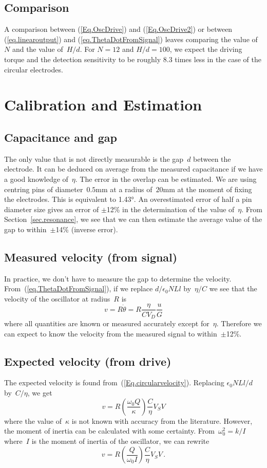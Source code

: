\subsection{Comparison}
A comparison between (\ref{Eq.OscDrive}) and (\ref{Eq.OscDrive2}) or between (\ref{eq.linearoutput}) and (\ref{eq.ThetaDotFromSignal}) leaves comparing the value of~$N$ and the value of~$H/d$. For $N=12$ and $H/d=100$, we expect the driving torque and the detection sensitivity to be roughly 8.3 times less in the case of the circular electrodes.

\section{Calibration and Estimation}
\subsection{Capacitance and gap}
The only value that is not directly measurable is the gap~$d$ between the electrode. It can be deduced on average from the measured capacitance if we have a good knowledge of~$\eta$. The error in the overlap can be estimated. We are using centring pins of diameter~$0.5$mm at a radius of~$20$mm at the moment of fixing the electrodes. This is equivalent to 1.43\si{\degree}. An overestimated error of half a pin diameter size gives an error of $\pm$12\% in the determination of the value of~$\eta$. From Section~\ref{sec.resonance}, we see that we can then estimate the average value of the gap to within~$\pm$14\% (inverse error).
\subsection{Measured velocity (from signal)}
In practice, we don't have to measure the gap to determine the velocity. From~(\ref{eq.ThetaDotFromSignal}), if we replace $d / \epsilon_0 N L l$ by~$\eta / C$ we see that the velocity of the oscillator at radius~$R$ is
\begin{equation}
v  = R \dot{\theta} = R\frac{\eta}{C V_D} \frac{u}{G}
\end{equation}
where all quantities are known or measured accurately except for~$\eta$. Therefore we can expect to know the velocity from the measured signal to within~$\pm$12\%.

\subsection{Expected velocity (from drive)}
The expected velocity is found from~(\ref{Eq.circularvelocity}). Replacing $\epsilon_0 N L l / d$ by~$C /\eta$, we get
\begin{equation}
v = R \left( \frac{\omega_0 Q}{\kappa} \right) \frac{C}{\eta} V_S V
\end{equation}
where the value of~$\kappa$ is not known with accuracy from the literature. However, the moment of inertia can be calculated with some certainty. From~$\omega^2_0 = k/I$ where~$I$ is the moment of inertia of the oscillator, we can rewrite
\begin{equation}
v = R \left( \frac{Q}{\omega_0 I} \right) \frac{C}{\eta} V_S V \,.
\end{equation}

